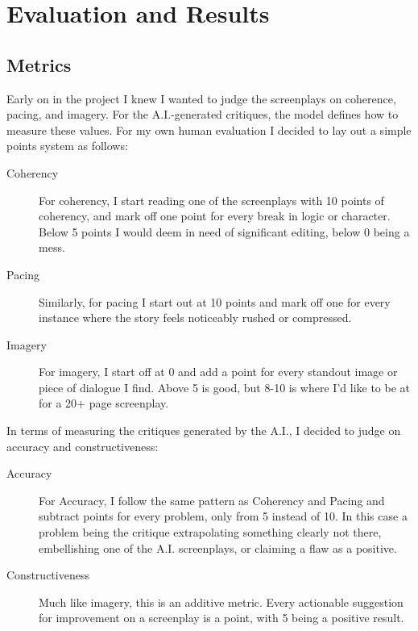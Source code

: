 \documentclass[sigconf]{acmart}
\begin{document}
\section{Evaluation and Results}
\subsection{Metrics}
\indent Early on in the project I knew I wanted to judge the screenplays on coherence, pacing, and imagery. For the A.I.-generated critiques, the model defines how to measure these values. For my own human evaluation I decided to lay out a simple points system as follows:
\begin{description}
    \item[Coherency] For coherency, I start reading one of the screenplays with 10 points of coherency, and mark off one point for every break in logic or character. Below 5 points I would deem in need of significant editing, below 0 being a mess.
    \item[Pacing] Similarly, for pacing I start out at 10 points and mark off one for every instance where the story feels noticeably rushed or compressed.
    \item[Imagery] For imagery, I start off at 0 and add a point for every standout image or piece of dialogue I find. Above 5 is good, but 8-10 is where I'd like to be at for a 20+ page screenplay.
\end{description}
In terms of measuring the critiques generated by the A.I., I decided to judge on accuracy and constructiveness:
\begin{description}
    \item[Accuracy] For Accuracy, I follow the same pattern as Coherency and Pacing and subtract points for every problem, only from 5 instead of 10. In this case a problem being the critique extrapolating something clearly not there, embellishing one of the A.I. screenplays, or claiming a flaw as a positive.
    \item[Constructiveness] Much like imagery, this is an additive metric. Every actionable suggestion for improvement on a screenplay is a point, with 5 being a positive result.
\end{description}
\end{document}
